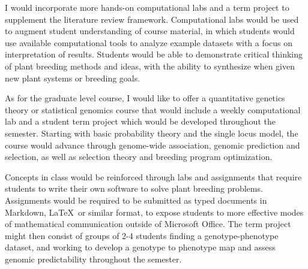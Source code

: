 \documentclass[11pt]{article}
\begin{document}
I would incorporate more hands-on computational labs and a term project to supplement the literature review framework. Computational labs would be used to augment student understanding of course material, in which students would use available computational tools to analyze example datasets with a focus on interpretation of results. Students would be able to demonstrate critical thinking of plant breeding methods and ideas, with the ability to synthesize when given new plant systems or breeding goals. 


As for the graduate level course, I would like to offer a quantitative genetics theory or statistical genomics course that would include a weekly computational lab and a student term project which would be developed throughout the semester. Starting with basic probability theory and the single locus model, the course would advance through genome-wide association, genomic prediction and selection, as well as selection theory and breeding program optimization. 

Concepts in class would be reinforced through labs and assignments that require students to write their own software to solve plant breeding problems. Assignments would be required to be submitted as typed documents in Markdown, \LaTeX\ or similar format, to expose students to more effective modes of mathematical communication outside of Microsoft Office. The term project might then consist of groups of 2-4 students finding a genotype-phenotype dataset, and working to develop a genotype to phenotype map and assess genomic predictability throughout the semester.


\end{document}
